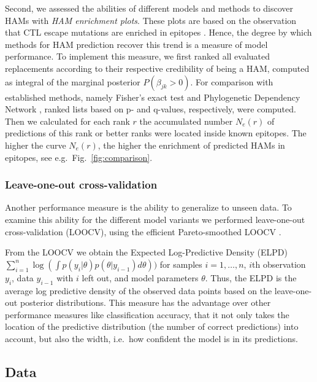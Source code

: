 \documentclass{bioinfo}
\begin{document}
\begin{methods}
Second, we assessed the abilities of different models and methods to discover HAMs with \emph{HAM enrichment plots}. These plots are based on the observation that CTL escape mutations are enriched in epitopes \citep{Bronke2013}. Hence, the degree by which methods for HAM prediction recover this trend is a measure of model performance. To implement this measure, we first ranked all evaluated replacements according to their respective credibility of being a HAM, computed as integral of the marginal posterior $P(\beta_{jk}>0)$. For comparison with established methods, namely Fisher's exact test and Phylogenetic Dependency Network \citep{Carlson2008}, ranked lists based on p- and q-values, respectively, were computed. Then we calculated for each rank $r$ the accumulated number $N_e(r)$ of predictions of this rank or better ranks were located inside known epitopes. The higher the curve $N_e(r)$, the higher the enrichment of predicted HAMs in epitopes, see e.g.\ Fig.\ \ref{fig:comparison}.

\subsubsection{Leave-one-out cross-validation}

Another performance measure is the ability to generalize to unseen data. To examine this ability for the different model variants we performed leave-one-out cross-validation (LOOCV), using the efficient Pareto-smoothed LOOCV \cite{Vehtari2016}.

From the LOOCV we obtain the Expected Log-Predictive Density (ELPD) $\sum_{i=1}^{n}\log(\int p(y_i|\theta)p(\theta|y_{i-1})d\theta))$ for samples $i=1,\ldots,n$, $i$th observation $y_i$, data $y_{i-1}$ with $i$ left out, and model parameters $\theta$. Thus, the ELPD is the average log predictive density of the observed data points based on the leave-one-out posterior distributions. This measure has the advantage over other performance measures like classification accuracy, that it not only takes the location of the predictive distribution (the number of correct predictions) into account, but also the width, i.e.\ how confident the model is in its predictions.

  \subsection{Data}


\end{methods}
\end{document}
